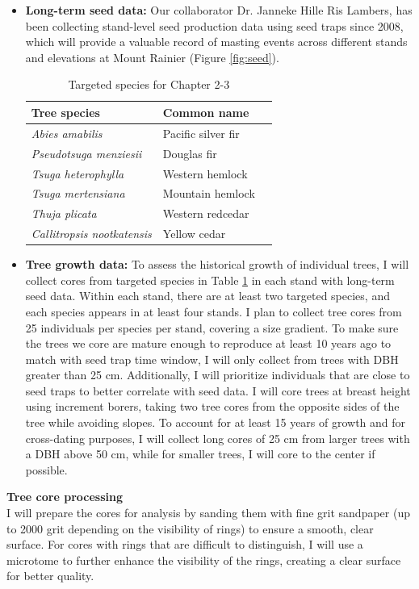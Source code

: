 \documentclass[11pt,letter]{article}
\begin{document}
\begin{itemize}
	\item \textbf{Long-term seed data:} Our collaborator Dr. Janneke Hille Ris Lambers, has been collecting stand-level seed production data using seed traps since 2008, which will provide a valuable record of masting events across different stands and elevations at Mount Rainier  (Figure \ref{fig:seed}).
\begin{table}[!h]
\centering
\small
\caption{Targeted species for Chapter 2-3}
\begin{tabular}{|p{5cm}|p{5cm}|p{5cm}|}
\hline
 \textbf{Tree species} & \textbf{Common name}\\ \hline 
\textit{Abies amabilis} & Pacific silver fir \\ \hline
\textit{Pseudotsuga menziesii} & Douglas fir\\ \hline
\textit{Tsuga heterophylla} & Western hemlock\\ \hline
\textit{Tsuga mertensiana} & Mountain hemlock\\ \hline
\textit{Thuja plicata} & Western redcedar\\ \hline
\textit{Callitropsis nootkatensis} & Yellow cedar\\ \hline
\end{tabular}
\label{table:species}
\end{table}
	\item \textbf{Tree growth data:}  To assess the historical growth of individual trees, I will collect cores from targeted species in Table \ref{table:species} in each stand with long-term seed data. Within each stand, there are at least two targeted species, and each species appears in at least four stands. I plan to collect tree cores from 25 individuals per species per stand, covering a size gradient. To make sure the trees we core are mature enough to reproduce at least 10 years ago to match with seed trap time window, I will only collect from trees with DBH greater than 25 cm. Additionally, I will prioritize individuals that are close to seed traps to better correlate with seed data. I will core trees at breast height using increment borers, taking two tree cores from the opposite sides of the tree while avoiding slopes. To account for at least 15 years of growth and for cross-dating purposes, I will collect long cores of 25 cm from larger trees with a DBH above 50 cm, while for smaller trees, I will core to the center if possible.
	\end{itemize}
\textbf{Tree core processing}\\
I will prepare the cores for analysis by sanding them with fine grit sandpaper (up to 2000 grit depending on the visibility of rings) to ensure a smooth, clear surface. For cores with rings that are difficult to distinguish, I will use a microtome to further enhance the visibility of the rings, creating a clear surface for better quality.\par
\end{document}
